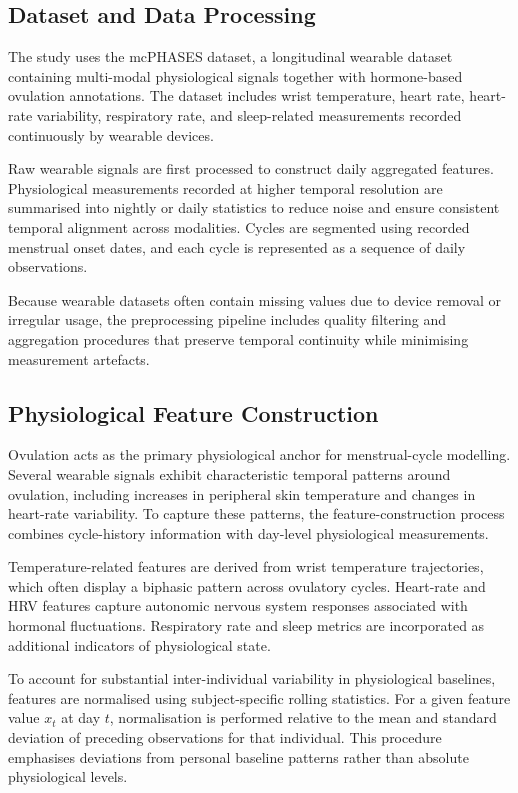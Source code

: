 \documentclass[conference]{IEEEtran}
\begin{document}
\subsection{Dataset and Data Processing}

The study uses the mcPHASES dataset, a longitudinal wearable dataset containing multi-modal physiological signals together with hormone-based ovulation annotations. The dataset includes wrist temperature, heart rate, heart-rate variability, respiratory rate, and sleep-related measurements recorded continuously by wearable devices.

Raw wearable signals are first processed to construct daily aggregated features. Physiological measurements recorded at higher temporal resolution are summarised into nightly or daily statistics to reduce noise and ensure consistent temporal alignment across modalities. Cycles are segmented using recorded menstrual onset dates, and each cycle is represented as a sequence of daily observations.

Because wearable datasets often contain missing values due to device removal or irregular usage, the preprocessing pipeline includes quality filtering and aggregation procedures that preserve temporal continuity while minimising measurement artefacts.

\subsection{Physiological Feature Construction}

Ovulation acts as the primary physiological anchor for menstrual-cycle modelling. Several wearable signals exhibit characteristic temporal patterns around ovulation, including increases in peripheral skin temperature and changes in heart-rate variability. To capture these patterns, the feature-construction process combines cycle-history information with day-level physiological measurements.

Temperature-related features are derived from wrist temperature trajectories, which often display a biphasic pattern across ovulatory cycles. Heart-rate and HRV features capture autonomic nervous system responses associated with hormonal fluctuations. Respiratory rate and sleep metrics are incorporated as additional indicators of physiological state.

To account for substantial inter-individual variability in physiological baselines, features are normalised using subject-specific rolling statistics. For a given feature value $x_t$ at day $t$, normalisation is performed relative to the mean and standard deviation of preceding observations for that individual. This procedure emphasises deviations from personal baseline patterns rather than absolute physiological levels.
\end{document}
